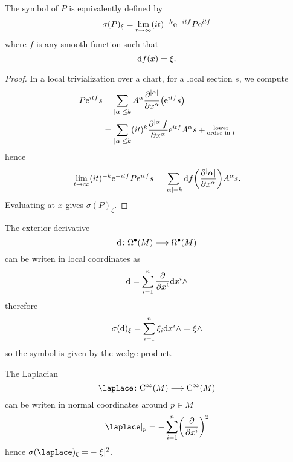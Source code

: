 \begin{lemma}
  The symbol of $P$ is equivalently defined by
  \begin{equation*}
    \sigma(P)_\xi = \lim_{t \to \infty} (it)^{-k} \mathrm{e}^{-i t f}
    P \mathrm{e}^{i t f}
  \end{equation*}
  where $f$ is any smooth function such that
  \begin{equation*}
    \mathrm{d} f (x) = \xi.
  \end{equation*}
\end{lemma}
\begin{proof}
  In a local trivialization over a chart, for a local section $s$, we compute
  \begin{align*}
    P \mathrm{e}^{i t f} s
    &= \sum_{|\alpha| \leq k} A^\alpha
    \frac{\partial^{|\alpha|}}{\partial x^\alpha}
    \bigl( \mathrm{e}^{i t f} s \bigr) \\
    &= \sum_{|\alpha| \leq k} (i t)^k
    \frac{\partial^{|\alpha|} f}{\partial x^\alpha} \mathrm{e}^{i t f}
    A^\alpha s +
    \substack{\text{lower} \\ \text{order in } t}
  \end{align*}
  hence
  \begin{equation*}
    \lim_{t \to \infty} (it)^{-k} \mathrm{e}^{-i t f} P \mathrm{e}^{i t f} s
    = \sum_{|\alpha| = k} \mathrm{d} f \biggl( \frac{\partial^|\alpha|}{\partial x^\alpha} \biggr) A^\alpha s.
  \end{equation*}
  Evaluating at $x$ gives $\sigma(P)_\xi$.
\end{proof}

\begin{example}
  The exterior derivative
  \begin{equation*}
    \mathrm{d} \colon \Omega^\bullet(M) \longrightarrow \Omega^\bullet (M)
  \end{equation*}
  can be writen in local coordinates as
  \begin{equation*}
    \mathrm{d} = \sum_{i=1}^n \frac{\partial}{\partial x^i} \mathrm{d} x^i \wedge
  \end{equation*}
  therefore
  \begin{equation*}
    \sigma(\mathrm{d})_\xi = \sum_{i=1}^n \xi_i \mathrm{d} x^i \wedge = \xi \wedge
  \end{equation*}
  so the symbol is given by the wedge product.
\end{example}

\begin{example}
  The Laplacian
  \begin{equation*}
    \laplace \colon \Crm^\infty(M) \longrightarrow \Crm^\infty (M)
  \end{equation*}
  can be writen in normal coordinates around $p \in M$
  \begin{equation*}
    \laplace |_p = - \sum_{i = 1}^n
    \biggl( \frac{\partial}{\partial x^i} \biggr)^2
  \end{equation*}
  hence $\sigma (\laplace)_\xi = - |\xi|^2$.
\end{example}

